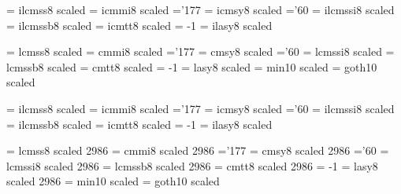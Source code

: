 \font\iseventeenrm   = ilcmss8  scaled  %
\font\iseventeeni    = icmmi8   scaled  %
    \skewchar\iseventeeni ='177                  %
\font\iseventeensy   = icmsy8   scaled  %
    \skewchar\iseventeensy ='60           %
\font\iseventeenit   = ilcmssi8 scaled  %
\font\iseventeenbf   = ilcmssb8 scaled  %
\font\iseventeentt   = icmtt8   scaled  %
    \hyphenchar\iseventeentt = -1         %
\font\iseventeenlasy = ilasy8  scaled  %

\font\twentyrm   = lcmss8  scaled  %
\font\twentyi    = cmmi8   scaled  %
    \skewchar\twentyi ='177                  %
\font\twentysy   = cmsy8   scaled  %
    \skewchar\twentysy ='60           %
\font\twentyit   = lcmssi8 scaled  %
\font\twentybf   = lcmssb8 scaled  %
\font\twentytt   = cmtt8   scaled  %
    \hyphenchar\twentytt = -1         %
\font\twentylasy = lasy8  scaled  %
\font\twtymin = min10  scaled  %
\font\twtygt = goth10  scaled  %

\font\itwentyrm   = ilcmss8  scaled  %
\font\itwentyi    = icmmi8   scaled  %
    \skewchar\itwentyi ='177                  %
\font\itwentysy   = icmsy8   scaled  %
    \skewchar\itwentysy ='60           %
\font\itwentyit   = ilcmssi8 scaled  %
\font\itwentybf   = ilcmssb8 scaled  %
\font\itwentytt   = icmtt8   scaled  %
    \hyphenchar\itwentytt = -1         %
\font\itwentylasy = ilasy8  scaled  %

\font\twentyfourrm   = lcmss8  scaled 2986 %
\font\twentyfouri    = cmmi8   scaled 2986 %
    \skewchar\twentyfouri ='177                  %
\font\twentyfoursy   = cmsy8   scaled 2986 %
    \skewchar\twentyfoursy ='60           %
\font\twentyfourit   = lcmssi8 scaled 2986 %
\font\twentyfourbf   = lcmssb8 scaled 2986 %
\font\twentyfourtt   = cmtt8   scaled 2986 %
    \hyphenchar\twentyfourtt = -1         %
\font\twentyfourlasy = lasy8  scaled 2986 %
\font\twfvmin = min10 scaled  %
\font\twfvgt = goth10 scaled  %

